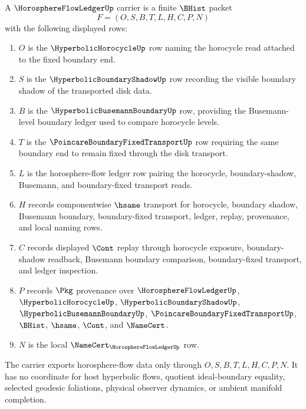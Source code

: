 \begin{definition}
\label{def:horosphere-flow-ledger-carrier}
A $\HorosphereFlowLedgerUp$ carrier is a finite $\BHist$ packet
$$
F=(O,S,B,T,L,H,C,P,N)
$$
with the following displayed rows:
\begin{enumerate}
\item $O$ is the $\HyperbolicHorocycleUp$ row naming the horocycle read attached to the fixed boundary end.
\item $S$ is the $\HyperbolicBoundaryShadowUp$ row recording the visible boundary shadow of the transported disk data.
\item $B$ is the $\HyperbolicBusemannBoundaryUp$ row, providing the Busemann-level boundary ledger used to compare horocycle levels.
\item $T$ is the $\PoincareBoundaryFixedTransportUp$ row requiring the same boundary end to remain fixed through the disk transport.
\item $L$ is the horosphere-flow ledger row pairing the horocycle, boundary-shadow, Busemann, and boundary-fixed transport reads.
\item $H$ records componentwise $\hsame$ transport for horocycle, boundary shadow, Busemann boundary, boundary-fixed transport, ledger, replay, provenance, and local naming rows.
\item $C$ records displayed $\Cont$ replay through horocycle exposure, boundary-shadow readback, Busemann boundary comparison, boundary-fixed transport, and ledger inspection.
\item $P$ records $\Pkg$ provenance over $\HorosphereFlowLedgerUp$, $\HyperbolicHorocycleUp$, $\HyperbolicBoundaryShadowUp$, $\HyperbolicBusemannBoundaryUp$, $\PoincareBoundaryFixedTransportUp$, $\BHist$, $\hsame$, $\Cont$, and $\NameCert$.
\item $N$ is the local $\NameCert_{\HorosphereFlowLedgerUp}$ row.
\end{enumerate}
The carrier exports horosphere-flow data only through $O,S,B,T,L,H,C,P,N$. It has no coordinate for host hyperbolic flows, quotient ideal-boundary equality, selected geodesic foliations, physical observer dynamics, or ambient manifold completion.
\end{definition}

